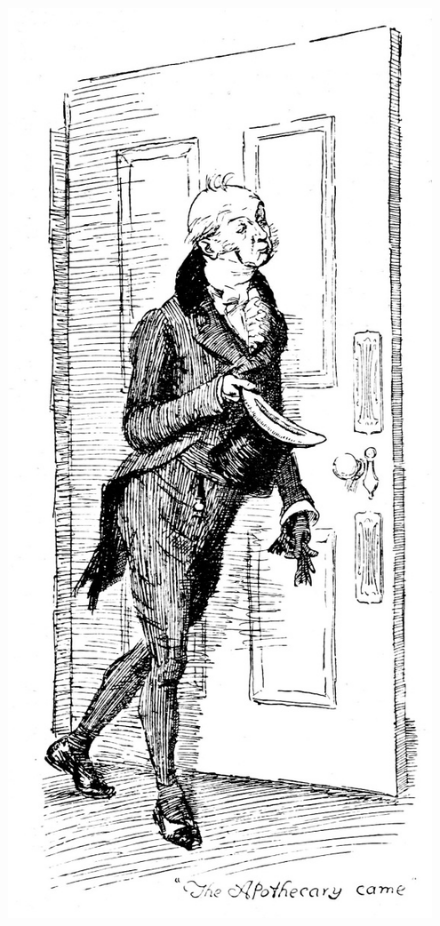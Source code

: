 \documentclass[10pt]{book}
\begin{document}
\begin{figure}[h]
\centering
\includegraphics[width=\linewidth]{images/i_073.jpg}
\end{figure}
\end{document}
